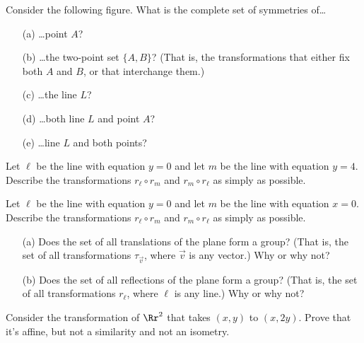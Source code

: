 \bigskip

\begin{TG}
Consider the following figure.
What is the complete set of symmetries of\dots
\begin{itemize}
\item[(a)] \dots point $A$?
\item[(b)] \dots the two-point set $\{A,B\}$?  (That is, the transformations
that either fix both $A$ and $B$, or that interchange them.)
\item[(c)] \dots the line $L$?
\item[(d)] \dots both line $L$ and point $A$?
\item[(e)] \dots line $L$ and both points?
\end{itemize}
\end{TG}

\bigskip

\begin{TG}
Let $\ell$ be the line with equation $y=0$ and let $m$ be the line
with equation $y=4$.  Describe the transformations
$r_\ell\circ r_m$ and $r_m\circ r_\ell$ as simply as possible.
\end{TG}

\bigskip

\begin{TG}
Let $\ell$ be the line with equation $y=0$ and let $m$ be the line
with equation $x=0$.  Describe the transformations
$r_\ell\circ r_m$ and $r_m\circ r_\ell$ as simply as possible.
\end{TG}

\bigskip

\begin{TG} \phantom{j}
\begin{itemize}
\item[(a)] Does the set of all translations of the plane form a group?  
(That is, the set of all transformations $\tau_{\vec v}$, where $\vec v$
is any vector.)  Why or why not?
\item[(b)] Does the set of all reflections of the plane form a group?
(That is, the set of all transformations $r_\ell$, where $\ell$
is any line.)  Why or why not?
\end{itemize}
\end{TG}

\begin{TG}
Consider the transformation of $\Rr^2$ that takes $(x,y)$ to $(x,2y)$.
Prove that it's affine, but not a similarity and not an isometry.
\end{TG}

